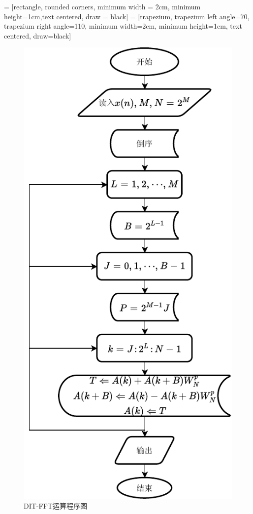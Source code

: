  = [rectangle, rounded corners, minimum width = 2cm, minimum height=1cm,text centered, draw = black]
 = [trapezium, trapezium left angle=70, trapezium right angle=110, minimum width=2cm, minimum height=1cm, text centered, draw=black]
\begin{figure}[H]
    \centering
    \includegraphics[scale=0.618]{Figure/flowchat.pdf}
    \caption{DIT-FFT运算程序图}%
    \label{fig:flowchat}
\end{figure}


